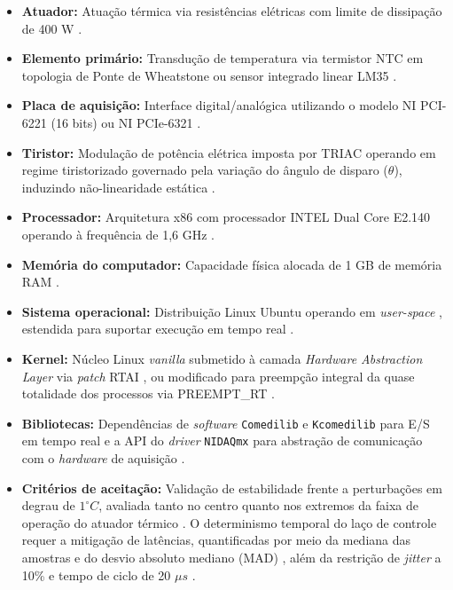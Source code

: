 \documentclass[conference,harvard,brazil,english]{sbatex}
\begin{document}
\begin{itemize}
    \item \textbf{Atuador:} Atuação térmica via resistências elétricas com limite de dissipação de 400 W \cite{evangelista2009plataforma}.
    \item \textbf{Elemento primário:} Transdução de temperatura via termistor NTC em topologia de Ponte de Wheatstone \cite{evangelista2009plataforma} ou sensor integrado linear LM35 \cite{mesquita_roteiro4B2,mesquita_roteiro4A1}.
    \item \textbf{Placa de aquisição:} Interface digital/analógica utilizando o modelo NI PCI-6221 (16 bits) \cite{evangelista2009plataforma} ou NI PCIe-6321 \cite{mesquita_roteiro4A4,mesquita_roteiro4B1,mesquita_roteiro4A1}.
    \item \textbf{Tiristor:} Modulação de potência elétrica imposta por TRIAC operando em regime tiristorizado governado pela variação do ângulo de disparo ($\theta$), induzindo não-linearidade estática \cite{evangelista2009plataforma,mesquita_roteiro4B2,mesquita_roteiro4A1}.
    \item \textbf{Processador:} Arquitetura x86 com processador INTEL Dual Core E2.140 operando à frequência de 1,6 GHz \cite{evangelista2009plataforma}.
    \item \textbf{Memória do computador:} Capacidade física alocada de 1 GB de memória RAM \cite{evangelista2009plataforma}.
    \item \textbf{Sistema operacional:} Distribuição Linux Ubuntu operando em \textit{user-space} \cite{evangelista2009plataforma}, estendida para suportar execução em tempo real \cite{mesquita_roteiro4A4}.
    \item \textbf{Kernel:} Núcleo Linux \textit{vanilla} submetido à camada \textit{Hardware Abstraction Layer} via \textit{patch} RTAI \cite{evangelista2009plataforma}, ou modificado para preempção integral da quase totalidade dos processos via PREEMPT\_RT \cite{mesquita_roteiro4A4,mesquita_roteiro4B1,mesquita_roteiro4A1}.
    \item \textbf{Bibliotecas:} Dependências de \textit{software} \texttt{Comedilib} e \texttt{Kcomedilib} para E/S em tempo real \cite{evangelista2009plataforma} e a API do \textit{driver} \texttt{NIDAQmx} para abstração de comunicação com o \textit{hardware} de aquisição \cite{mesquita_roteiro4A4}.
    \item \textbf{Critérios de aceitação:} Validação de estabilidade frente a perturbações em degrau de $1^{\circ}C$, avaliada tanto no centro quanto nos extremos da faixa de operação do atuador térmico \cite{mesquita_roteiro4A5e6}. O determinismo temporal do laço de controle requer a mitigação de latências, quantificadas por meio da mediana das amostras e do desvio absoluto mediano (MAD) \cite{mesquita_roteiro4A4}, além da restrição de \textit{jitter} a 10\% e tempo de ciclo de 20 $\mu s$ \cite{evangelista2009plataforma}.
\end{itemize}
\end{document}
